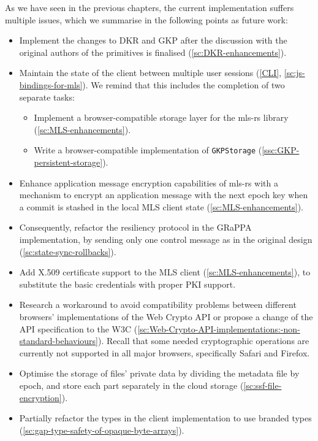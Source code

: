 As we have seen in the previous chapters,
the current implementation suffers multiple issues,
which we summarise in the following points as future work:
\begin{itemize}
    \item Implement the changes to DKR and GKP after the discussion with the original authors of the primitives is finalised (\cref{sc:DKR-enhancements}).
    \item Maintain the state of the client between multiple user sessions (\cref{CLI}, \cref{sc:js-bindings-for-mls}). We remind that this includes the completion of two separate tasks:
    \begin{itemize}
        \item Implement a browser-compatible storage layer for the mls-rs library (\cref{sc:MLS-enhancements}).
        \item Write a browser-compatible implementation of \texttt{GKPStorage} (\cref{ssc:GKP-persistent-storage}).
    \end{itemize}
    \item Enhance application message encryption capabilities of mls-rs with a mechanism to encrypt an application message with the next epoch key when a commit is stashed in the local MLS client state (\cref{sc:MLS-enhancements}).
    \item Consequently, refactor the resiliency protocol in the GRaPPA implementation, by sending only one control message as in the original design (\cref{sc:state-sync-rollbacks}).
    \item Add X.509 certificate support to the MLS client (\cref{sc:MLS-enhancements}), to substitute the basic credentials with proper PKI support.
    \item Research a workaround to avoid compatibility problems between different browsers' implementations of the Web Crypto API or propose a change of the API specification to the W3C  (\cref{sc:Web-Crypto-API-implementations:-non-standard-behaviours}). Recall that some needed cryptographic operations are currently not supported in all major browsers, specifically Safari and Firefox. 
    \item Optimise the storage of files' private data by dividing the metadata file by epoch, and store each part separately in the cloud storage (\cref{sc:ssf-file-encryption}).
    \item Partially refactor the types in the client implementation to use branded types (\cref{sc:gap-type-safety-of-opaque-byte-arrays}).
\end{itemize}

